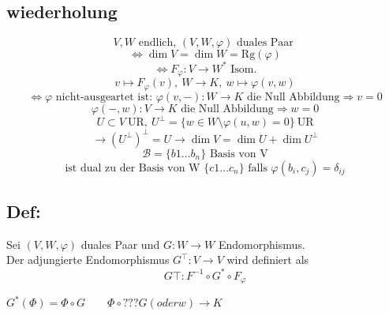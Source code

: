 \documentclass[titlepage,12pt,a4paper,ngerman]{report}
\newcommand{\tx}[1]{\textrm{#1}}
\begin{document}

\subsection{wiederholung}
$$V, W \tx{ endlich, } (V,W,\varphi) \tx{ duales Paar }$$ 
$$\Leftrightarrow \dim V = \dim W = \tx{Rg}(\varphi)$$  
$$\Leftrightarrow F_\varphi: V \to W^* \tx{ Isom.}$$
$$v \mapsto F_\varphi(v),\ W \to K,\ w \mapsto \varphi(v,w)$$
$$\Leftrightarrow \varphi \tx{ nicht-ausgeartet ist: } \varphi(v,-): W \to K \tx{ die Null Abbildung} \Rightarrow v = 0$$
$$\varphi(-,w): V \to K  \tx{ die Null Abbildung} \Rightarrow w = 0$$
$$U \subset V\ \tx{UR},\ U^\perp = \{w \in W \setminus \varphi(u,w) = 0\}\ \tx{UR}$$
$$\rightarrow(U^\perp)^\perp = U \rightarrow \dim V = \dim U + \dim U^\perp$$
$$\mathcal B = \{b1 \dots b_n\}\tx{ Basis von V}$$
$$\tx{ist dual zu der Basis von W }\{c1 \dots c_n\} \tx{ falls } \varphi(b_i,c_j) = \delta_{ij}$$
\subsection{Def:}
Sei $(V,W,\varphi)$ duales Paar und $G:W \to W$ Endomorphismus.\\
Der adjungierte Endomorphismus $G^\top: V \to V$ wird definiert als $$G\top:F^{-1} \circ G^* \circ F_\varphi$$
\begin{center}
\end{center}
$ G^*(\Phi) = \Phi \circ G \qquad \Phi \circ ??? G (oder w ) \to K $
\end{document}
